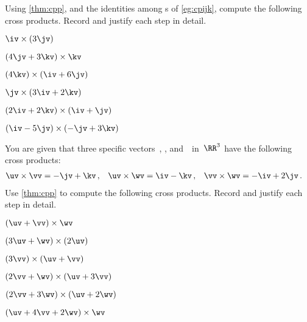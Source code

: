 \begin{exercise}  
Using \cref{thm:cpp}, and the identities among s of \cref{eg:cpijk}, compute the following cross products.
Record and justify each step in detail.
\begin{Parts}
\item \(\iv\times(3\jv)\)
\answer{\(3\kv\)}
\item \((4\jv+3\kv)\times\kv\)
\answer{\(4\iv\)}
\begin{OmitV1}
\item \((4\kv)\times(\iv+6\jv)\)
\answer{\(-24\iv +4\jv\)}
\item \(\jv\times(3\iv+2\kv)\)
\answer{\(2\iv-3\kv\)}
\end{OmitV1}
\item \((2\iv+2\kv)\times(\iv+\jv)\)
\answer{\(-2\iv +2\jv +2\kv\)}
\item \((\iv-5\jv)\times(-\jv+3\kv)\)
\answer{\(-15\iv-3\jv-\kv\)}
\end{Parts}
\end{exercise}




\begin{exercise}  
You are given that three specific vectors~\uv, \vv, and~\wv\ in~\(\RR^3\) have the following cross products:
\begin{align*}
&\uv\times\vv=-\jv+\kv\,,
&&\uv\times\wv=\iv-\kv\,,
&&\vv\times\wv=-\iv+2\jv\,.
\end{align*}
Use \cref{thm:cpp} to compute the following cross products.
Record and justify each step in detail.

\begin{Parts}
\item \((\uv+\vv)\times\wv\)
\answer{\(2\jv -\kv\)}
\item \((3\uv+\wv)\times(2\uv)\)
\answer{\(-2\iv+2\kv\)}
\begin{OmitV1}
\item \((3\vv)\times(\uv+\vv)\)
\answer{\(3\jv -3\kv\)}
\item \((2\vv+\wv)\times(\uv+3\vv)\)
\answer{\(2\iv -4\jv -\kv\)}
\end{OmitV1}
\item \((2\vv+3\wv)\times(\uv+2\wv)\)
\answer{\(-7\iv +10\jv +\kv\)}
\item \((\uv+4\vv+2\wv)\times\wv\)
\answer{\(-3\iv +8\jv -\kv\)}
\end{Parts}
\end{exercise}







